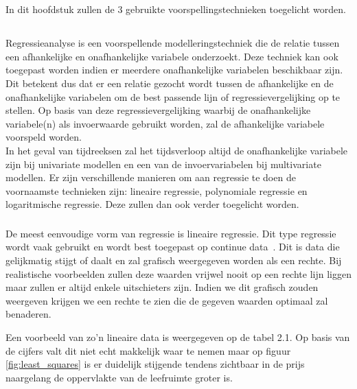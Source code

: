 \chapter{}
\label{ch:stand-van-zaken}

In dit hoofdstuk zullen de 3 gebruikte voorspellingstechnieken toegelicht worden.

\section{}
\label{subsec: Theoretische toelichting over polynomiale regressie}

Regressieanalyse is een voorspellende modelleringstechniek die de relatie tussen een afhankelijke en onafhankelijke variabele onderzoekt. Deze techniek kan ook toegepast worden indien er meerdere onafhankelijke variabelen beschikbaar zijn.
Dit betekent dus dat er een relatie gezocht wordt tussen de afhankelijke en de onafhankelijke variabelen om de best passende lijn of regressievergelijking op te stellen. Op basis van deze regressievergelijking waarbij de onafhankelijke variabele(n) als invoerwaarde gebruikt worden, zal de afhankelijke variabele voorspeld worden.
\\ In het geval van tijdreeksen zal het tijdsverloop altijd de onafhankelijke variabele zijn bij univariate modellen en een van de invoervariabelen bij multivariate modellen. 
Er zijn verschillende manieren om aan regressie te doen de voornaamste technieken zijn: lineaire regressie, polynomiale regressie en logaritmische regressie. Deze zullen dan ook verder toegelicht worden.

\subsection{}
De meest eenvoudige vorm van regressie is lineaire regressie. Dit type regressie wordt vaak gebruikt en wordt best toegepast op continue data~\autocite{Pant2019}. Dit is data die gelijkmatig stijgt of daalt en zal grafisch weergegeven worden als een rechte. Bij realistische voorbeelden zullen deze waarden vrijwel nooit op een rechte lijn liggen maar zullen er altijd enkele uitschieters zijn. Indien we dit grafisch zouden weergeven krijgen we een rechte te zien die de gegeven waarden optimaal zal benaderen.

Een voorbeeld van zo'n lineaire data is weergegeven op de tabel 2.1. Op basis van de cijfers valt dit niet echt makkelijk waar te nemen maar op figuur \ref{fig:least_squares} is er duidelijk stijgende tendens zichtbaar in de prijs naargelang de oppervlakte van de leefruimte groter is.

